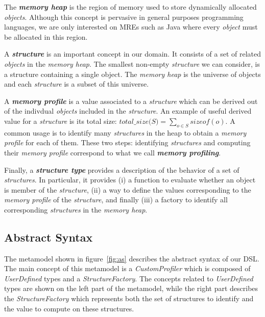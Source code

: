 The \textbf{\textit{memory heap}} is the region of memory used to store dynamically allocated \textit{objects}.
Although this concept is pervasive in general purposes programming languages, we are only interested on MREs such as Java where every \textit{object} must be allocated in this region.

A \textbf{\textit{structure}} is an important concept in our domain.
It consists of a set of related \textit{objects} in the \textit{memory heap}.
The smallest non-empty \textit{structure} we can consider, is a structure containing a single object.
The \textit{memory heap} is the universe of objects and each \textit{structure} is a subset of this universe.

A \textbf{\textit{memory profile}} is a value associated to a \textit{structure} which can be derived out of the indivdual \textit{objects} included in the \textit{structure}. 
An example of useful derived value for a \textit{structure} is its total size: $\textit{total\_size(S)} = \sum_{o \in S} {sizeof(o)}$.
A common usage is to identify many \textit{structures} in the heap to obtain a \textit{memory profile} for each of them.
These two steps: identifying \textit{structures} and computing their \textit{memory profile} correspond to what we call \textbf{\textit{memory profiling}}. 

Finally, a \textbf{\textit{structure type}} provides a description of the behavior of a set of \textit{structures}. 
In particular, it provides (i) a function to evaluate whether an object is member of the \textit{structure}, (ii) a way to define the values corresponding to the \textit{memory profile} of the \textit{structure}, and finally (iii) a factory to identify all  corresponding \textit{structures} in the \textit{memory heap}.

\subsection{Abstract Syntax}\label{sec:abstract-syntax}

The metamodel shown in figure~\ref{fig:as} describes the abstract syntax of our DSL.
The main concept of this metamodel is a \textit{CustomProfiler} which is composed of \textit{UserDefined} types and a \textit{StructureFactory}.
The concepts related to \textit{UserDefined} types are shown on the left part of the metamodel, while the right part describes the \textit{StructureFactory} which represents both the set of  structures to identify and the value to compute on these structures.

